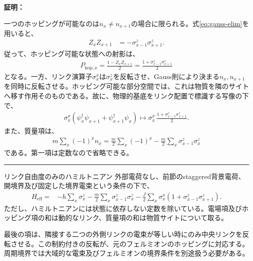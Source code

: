 \documentclass[a4paper,10.5pt]{article}
\numberwithin{equation}{section}
\newenvironment{proofbox}
{\begin{prooflabel}\textbf{証明：}\end{prooflabel}\vspace{0.8em}}
{\par\vspace{1em}\hrule\vspace{1em}}
\begin{document}
\begin{proofbox}
一つのホッピングが可能なのは$n_x\neq n_{x+1}$の場合に限られる。式\eqref{eq:gauss-elim}を用いると、
\begin{align}
Z_xZ_{x+1}&=-\sigma_{x-1}^z\sigma_{x+1}^z.
\end{align}
従って、ホッピング可能な状態への射影は、
\begin{align}
P_{\mathrm{hop},x}
=\frac{1-Z_xZ_{x+1}}2
=\frac{1+\sigma_{x-1}^z\sigma_{x+1}^z}{2}
\label{eq:hop-proj}
\end{align}
となる。一方、リンク演算子$\sigma_x^x$は$\sigma_x^z$を反転させ、Gauss則により決まる$n_x,n_{x+1}$を同時に反転させる。ホッピング可能な部分空間では、これは物質を隣のサイトへ移す作用そのものである。故に、物理的基底をリンク配置で標識する写像の下で、
\begin{align}
\sigma_x^x
(\psi_x^\dagger\psi_{x+1}+\psi_{x+1}^\dagger\psi_x)
\longmapsto
\sigma_x^x\,\frac{1+\sigma_{x-1}^z\sigma_{x+1}^z}{2}.
\end{align}
また、質量項は、
\begin{align}
m\sum_x(-1)^xn_x
=\frac m2\sum_x(-1)^x
-\frac m2\sum_x\sigma_{x-1}^z\sigma_x^z
\end{align}
である。第一項は定数なので省略できる。
\end{proofbox}
\begin{resultbox}{リンク自由度のみのハミルトニアン}
外部電荷なし、前節のstaggered背景電荷、開境界及び固定した境界電束という条件の下で、
\begin{align}
H_{\mathrm{eff}}
={}&-h\sum_x\sigma_x^z
-\frac m2\sum_x\sigma_{x-1}^z\sigma_x^z
-\frac J2\sum_x\sigma_x^x
\left(1+\sigma_{x-1}^z\sigma_{x+1}^z\right).
\label{eq:final}
\end{align}
ただし、ハミルトニアンには状態に依存しない定数を除いている。電場項及びホッピング項の和は動的なリンク、質量項の和は物質サイトについて取る。
\end{resultbox}
最後の項は、隣接する二つの外側リンクの電束が等しい時にのみ中央リンクを反転させる。この制約付きの反転が、元のフェルミオンのホッピングに対応する。周期境界では大域的な電束及びフェルミオンの境界条件を別途扱う必要がある。



\end{document}
